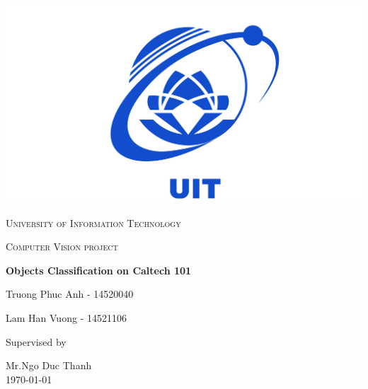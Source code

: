 \begin{titlepage}


\thispagestyle{empty}
\setlength\headheight{0pt} 
\begin{center}

\begin{center}
\includegraphics[width=0.5\linewidth]{images/logo.jpg}            
\end{center}	

        \vspace{0.25cm}
        {\scshape\LARGE University of Information Technology \par}
        \vspace{0.25cm}
        {\scshape\Large Computer Vision project\par}
        \vspace{0.5cm}

        {\Large\bfseries Objects Classification on Caltech 101\par}
        
        \vspace{0.5cm}
        {Truong Phuc Anh - 14520040\par}
        {Lam Han Vuong - 14521106\par}
        \vspace{0.25cm}

\vspace{1cm}
Supervised by\par
Mr.Ngo Duc Thanh \\
\vspace{1.5cm}
\large
\today

\end{center}

\clearpage
\restoregeometry
\end{titlepage}
